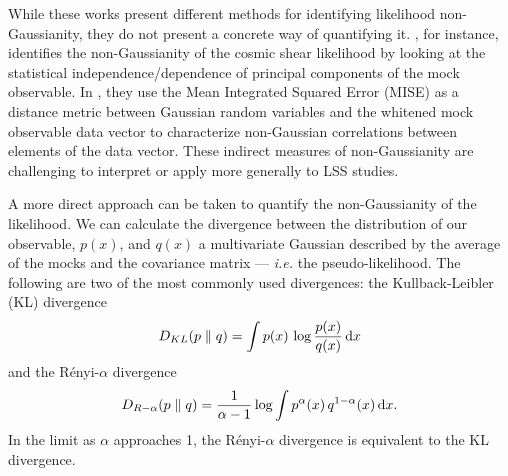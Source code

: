 \documentclass[12pt, letterpaper, preprint]{aastex6}
\newcommand{\beq}{\begin{equation}}
\newcommand{\eeq}{\end{equation}}
\newcommand{\lss}{{\small{LSS}}\xspace}
\begin{document}
While these works present different methods for identifying 
likelihood non-Gaussianity, they do not present a concrete way of 
quantifying it. \cite{hartlap2009}, for instance, identifies the
non-Gaussianity of the cosmic shear likelihood by looking at the
statistical independence/dependence of principal components of the mock 
observable. In \cite{sellentin2017}, they use the Mean
Integrated Squared Error (MISE) as a distance metric between 
Gaussian random variables and the whitened mock observable 
data vector to characterize non-Gaussian correlations between elements 
of the data vector. These indirect measures of non-Gaussianity 
are challenging to interpret or apply more generally to \lss studies. 

A more direct approach can be taken to quantify the 
non-Gaussianity of the likelihood. We can calculate the divergence between 
the distribution of our observable, $p(x)$, and $q(x)$ a multivariate Gaussian described 
by the average of the mocks and the covariance matrix --- \emph{i.e.} 
the pseudo-likelihood. The following are two of the most commonly used 
divergences: the Kullback-Leibler (KL) divergence
\beq \label{eq:kl} 
D_{KL} ( p \parallel q ) = \int p(x)\,\log \frac{p(x)}{q(x)}\,{\rm d}x
\eeq
and the R\'enyi-$\alpha$ divergence
\beq \label{eq:renyi}
D_{R-\alpha} ( p \parallel q ) = \frac{1}{\alpha -1} \log \int p^\alpha(x)\, q^{1 -\alpha}(x)\,{\rm d}x. 
\eeq
In the limit as $\alpha$ approaches 1, the R\'enyi-$\alpha$ divergence is
equivalent to the KL divergence.
\end{document}
